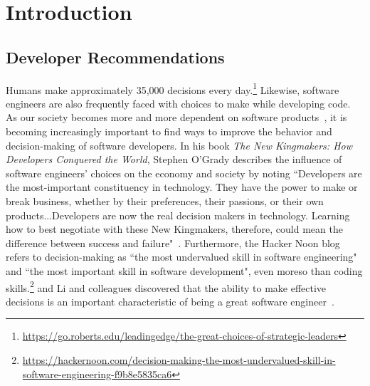 \section{Introduction}

\subsection{Developer Recommendations}

Humans make approximately 35,000 decisions every day.\footnote{\url{https://go.roberts.edu/leadingedge/the-great-choices-of-strategic-leaders}} Likewise, software engineers are also frequently faced with choices to make while developing code. As our society becomes more and more dependent on software products~\cite{SoftwareEatWorld}, it is becoming increasingly important to find ways to improve the behavior and decision-making of software developers. In his book \textit{The New Kingmakers: How Developers Conquered the World}, Stephen O'Grady describes the influence of software engineers' choices on the economy and society by noting ``Developers are the most-important constituency in technology. They have the power to make or break business, whether by their preferences, their passions, or their own products...Developers are now the real decision makers in technology. Learning how to best negotiate with these New Kingmakers, therefore, could mean the difference between success and failure"~\cite[p.~3-4]{OGrady2013King}. Furthermore, the Hacker Noon blog refers to decision-making as ``the most undervalued skill in software engineering" and ``the most important skill in software development", even moreso than coding skills.\footnote{\url{https://hackernoon.com/decision-making-the-most-undervalued-skill-in-software-engineering-f9b8e5835ca6}} and Li and colleagues discovered that the ability to make effective decisions is an important characteristic of being a great software engineer~\cite{GreatSoftwareEngineer}. 

